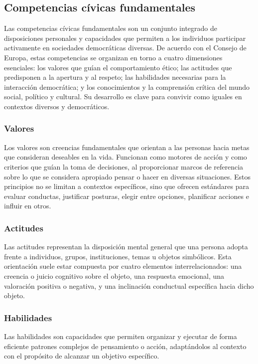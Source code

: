 \subsection{Competencias cívicas fundamentales}
Las competencias cívicas fundamentales son un conjunto integrado de
disposiciones personales y capacidades que permiten a los individuos participar
activamente en sociedades democráticas diversas. De acuerdo con el Consejo de
Europa, estas competencias se organizan en torno a cuatro dimensiones
esenciales: los valores que guían el comportamiento ético; las actitudes que
predisponen a la apertura y al respeto; las habilidades necesarias para la
interacción democrática; y los conocimientos y la comprensión crítica del mundo
social, político y cultural. Su desarrollo es clave para convivir como iguales
en contextos diversos y democráticos. \cite{barrett2016competences}

\subsubsection{Valores}
Los valores son creencias fundamentales que orientan a las personas hacia metas
que consideran deseables en la vida. Funcionan como motores de acción y como
criterios que guían la toma de decisiones, al proporcionar marcos de referencia
sobre lo que se considera apropiado pensar o hacer en diversas situaciones.
Estos principios no se limitan a contextos específicos, sino que ofrecen
estándares para evaluar conductas, justificar posturas, elegir entre opciones,
planificar acciones e influir en otros. \cite{barrett2016competences}

\subsubsection{Actitudes}
Las actitudes representan la disposición mental general que una persona adopta
frente a individuos, grupos, instituciones, temas u objetos simbólicos. Esta
orientación suele estar compuesta por cuatro elementos interrelacionados: una
creencia o juicio cognitivo sobre el objeto, una respuesta emocional, una
valoración positiva o negativa, y una inclinación conductual específica hacia
dicho objeto. \cite{barrett2016competences}

\subsubsection{Habilidades}
Las habilidades son capacidades que permiten organizar y ejecutar de forma
eficiente patrones complejos de pensamiento o acción, adaptándolos al contexto
con el propósito de alcanzar un objetivo específico.
\cite{barrett2016competences}

